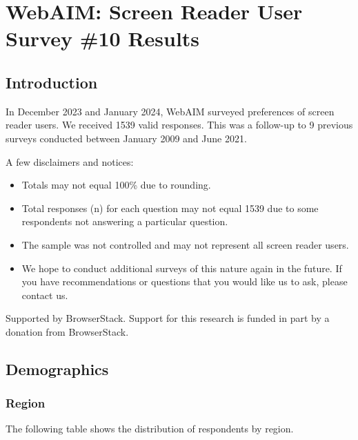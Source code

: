 \chapter{WebAIM: Screen Reader User Survey \#10 Results}\label{chap:webaim-survey}

\section{Introduction}\label{sec:intro}

In December 2023 and January 2024, WebAIM surveyed preferences of screen reader users. We received 1539 valid responses. This was a follow-up to 9 previous surveys conducted between January 2009 and June 2021.

A few disclaimers and notices:
\begin{itemize}
    \item Totals may not equal 100\% due to rounding.
    \item Total responses (n) for each question may not equal 1539 due to some respondents not answering a particular question.
    \item The sample was not controlled and may not represent all screen reader users.
    \item We hope to conduct additional surveys of this nature again in the future. If you have recommendations or questions that you would like us to ask, please contact us.
\end{itemize}

Supported by BrowserStack. Support for this research is funded in part by a donation from BrowserStack.

\section{Demographics}\label{sec:demographics}

\subsection{Region}\label{subsec:region}
The following table shows the distribution of respondents by region.

